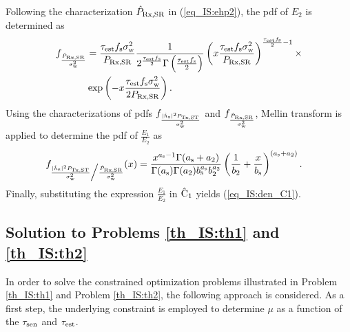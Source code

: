 {\begin{IEEEproof}[Solution]
Following the characterization $\eprcvdsr$ in (\ref{eq_IS:ehp2}), the pdf of $E_2$ is determined as 
\begin{align}
\dsnrp &= \frac{\Kp \npo}{\prcvdsr} \frac{1}{ 2^{\frac{\Kp}{2}} \Gamma\left(\frac{\Kp}{2}\right)} \left(x \frac{\Kp \npo}{ \prcvdsr} \right)^{\frac{\Kp}{2} - 1} \times \nonumber  \\ \quad & \exp \left(- x \frac{\Kp \npo}{2 \prcvdsr}  \right) \label{eq_IS:dsnrp}. 
\end{align}
Using the characterizations of pdfs $\dsnrs$ and $\dsnrp$, Mellin transform \cite{NIST} is applied to determine the pdf of $\frac{E_1}{E_2}$ as
\begin{align}
\dsnrsp(x) &= \frac{x^{\as - 1} \Gamma(\as + \ap)}{\Gamma(\as) \Gamma(\ap) \bs^{\as} \bp^{\ap}} \left(\frac{1}{\bp} + \frac{x}{\bs}\right)^{(\as + \ap)}. \label{eq_IS:dsnrsp} 
\end{align} 
Finally, substituting the expression $\frac{E_1}{E_2}$ in $\eco$ yields (\ref{eq_IS:den_C1}).
\end{IEEEproof}



\subsection{Solution to Problems \ref{th_IS:th1} and \ref{th_IS:th2}} \label{ssec_IS:th1} 
\begin{IEEEproof}[Solution] 
In order to solve the constrained optimization problems illustrated in Problem \ref{th_IS:th1} and Problem \ref{th_IS:th2}, the following approach is considered. As a first step, the underlying constraint is employed to determine $\mu$ as a function of the $\tsen$ and $\test$. %


\end{IEEEproof}}
